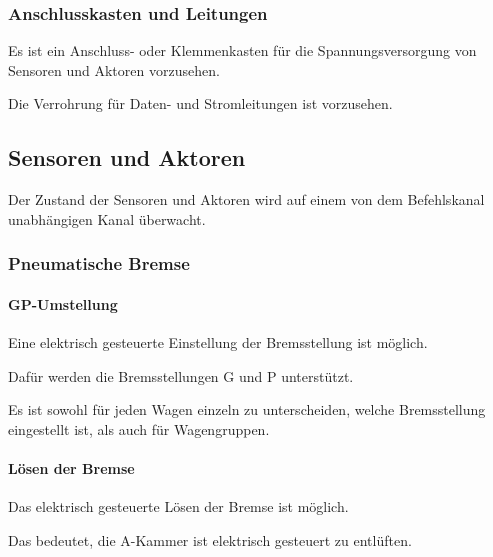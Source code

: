 \subsubsection{Anschlusskasten und Leitungen}
\begin{feat}
Es ist ein Anschluss- oder Klemmenkasten für die Spannungsversorgung von Sensoren und Aktoren vorzusehen. 
\end{feat}
\begin{feat}
Die Verrohrung für Daten- und Stromleitungen ist vorzusehen.%
\end{feat}

\subsection{Sensoren und Aktoren}
\begin{feat}
Der Zustand der Sensoren und Aktoren wird auf einem von dem Befehlskanal unabhängigen Kanal überwacht.
\end{feat}
\subsubsection{Pneumatische Bremse}
\paragraph{GP-Umstellung}
\begin{feat}
Eine elektrisch gesteuerte Einstellung der Bremsstellung ist möglich.
\end{feat}
\begin{rem} [zu Anf. 14]
Dafür werden die Bremsstellungen G und P unterstützt.
\end{rem}
\begin{rem} [zu Anf. 14]
Es ist sowohl für jeden Wagen einzeln zu unterscheiden, welche Bremsstellung eingestellt ist, als auch für Wagengruppen.%
\end{rem}

\paragraph{Lösen der Bremse}
\begin{feat}
Das elektrisch gesteuerte Lösen der Bremse ist möglich.
\end{feat}
\begin{rem}[zu Anf. 15]
Das bedeutet, die A-Kammer ist elektrisch gesteuert zu entlüften.
\end{rem}

